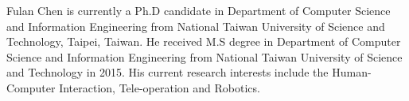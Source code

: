 Fulan Chen is currently a Ph.D candidate in Department of Computer Science and Information Engineering from National Taiwan University of Science and Technology, Taipei, Taiwan. He received M.S degree in Department of Computer Science and Information Engineering from National Taiwan University of Science and Technology in 2015. His current research interests include the Human-Computer Interaction, Tele-operation and Robotics. 